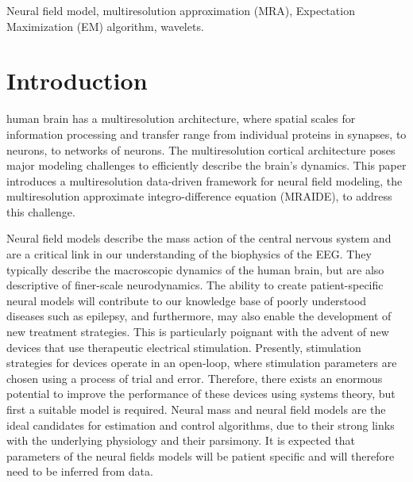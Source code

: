 \documentclass[journal,a4paper]{IEEEtran}
\begin{document}
\begin{IEEEkeywords}
Neural field model, multiresolution approximation (MRA), Expectation Maximization (EM) algorithm, wavelets.
\end{IEEEkeywords}

\IEEEpeerreviewmaketitle

\section{Introduction}
 human brain has a multiresolution architecture, where spatial scales for information processing and transfer range from individual proteins in synapses, to neurons, to networks of neurons. The multiresolution cortical architecture poses major modeling challenges to efficiently describe the brain's dynamics. This paper introduces a multiresolution data-driven framework for neural field modeling, the multiresolution approximate integro-difference equation (MRAIDE), to address this challenge. 

Neural field models describe the mass action of the central nervous system and are a critical link in our understanding of the biophysics of the EEG. They typically describe the macroscopic dynamics of the human brain, but are also descriptive of finer-scale neurodynamics. The ability to create patient-specific neural models will contribute to our knowledge base of poorly understood diseases such as epilepsy, and furthermore, may also enable the development of new treatment strategies. This is particularly poignant with the advent of new devices that use therapeutic electrical stimulation. Presently, stimulation strategies for devices operate in an open-loop, where stimulation parameters are chosen using a process of trial and error. Therefore, there exists an enormous potential to improve the performance of these devices using systems theory, but first a suitable model is required. Neural mass and neural field models are the ideal candidates for estimation and control algorithms, due to their strong links with the underlying physiology and their parsimony. It is expected that parameters of the neural fields models will be patient specific and will therefore need to be inferred from data.
\end{document}
